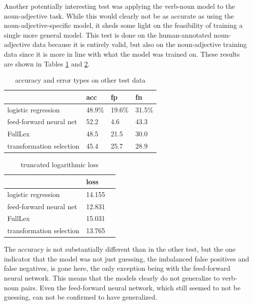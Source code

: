 \documentclass[a4paper, 12pt]{article}
\begin{document}
Another potentially interesting test was applying the verb-noun model to the noun-adjective task. While this would clearly not be as accurate as using the noun-adjective-specific model, it sheds some light on the feasibility of training a single more general model. This test is done on the human-annotated noun-adjective data because it is entirely valid, but also on the noun-adjective training data since it is more in line with what the model was trained on. These results are shown in Tables \ref{accuracy-vn-na} and \ref{loss-vn-na}.

\begin{table}[]
	\centering
	\begin{tabular}{l|lll}
		                         & acc      & fp       & fn        \\ \hline
		logistic regression      & 48.9\%   & 19.6\%   & 31.5\%    \\
		feed-forward neural net  & 52.2     & 4.6      & 43.3      \\
		FullLex                  & 48.5     & 21.5     & 30.0      \\
		transformation selection & 45.4     & 25.7     & 28.9
	\end{tabular}
	\caption{accuracy and error types on other test data}
	\label{accuracy-vn-na}
\end{table}

\begin{table}[]
	\centering
	\begin{tabular}{l|l|l}
		                         & loss      \\ \hline
		logistic regression      & 14.155    \\
		feed-forward neural net  & 12.831    \\
		FullLex                  & 15.031    \\
		transformation selection & 13.765
	\end{tabular}
	\caption{truncated logarithmic loss}
	\label{loss-vn-na}
\end{table}

The accuracy is not substantially different than in the other test, but the one indicator that the model was not just guessing, the imbalanced false positives and false negatives, is gone here, the only exception being with the feed-forward neural network. This means that the models clearly do not generalize to verb-noun pairs. Even the feed-forward neural network, which still seemed to not be guessing, can not be confirmed to have generalized.
\end{document}

